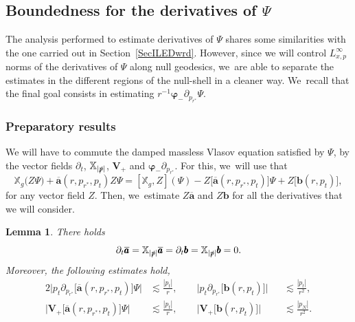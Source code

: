 \documentclass[10pt]{amsart}
\theoremstyle{plain}
\newtheorem{lemma}[proposition]{Lemma}
\theoremstyle{definition}
\newcommand\T{{\mathbb{X}}}
\begin{document}
\subsection{Boundedness for the derivatives of $\Psi$}

The analysis performed to estimate derivatives of $\Psi$ shares some similarities with the one carried out in Section~\ref{SecILEDwrd}. However, since we will control $L^\infty_{x,p}$ norms of the derivatives of $\Psi$ along null geodesics, we~are able to separate the estimates in the different regions of the null-shell in a cleaner way. We~recall that the final goal consists in estimating $r^{-1}\pmb{\varphi}_- \partial_{p_{r^*}} \Psi$.

\subsubsection{Preparatory results}
We will have to commute the damped massless Vlasov equation satisfied by $\Psi$, by the vector fields $\partial_t$, $\T_{|\slashed{p}|}$, $\pmb{V}_{\! +}$ and $ \pmb{ \varphi}_- \partial_{p_{r^*}}$. For this, we~will use that
\begin{equation}\label{eq:ComZ}
\T_g \bigl(Z \Psi \bigr)+ \overline{\pmb{a}}(r,p_{r^*},p_t) Z \Psi = [\T_g,Z] (\Psi)- Z \bigl[\overline{\pmb{a}}(r,p_{r^*},p_t) \bigr] \Psi+Z \bigl[\pmb{b} (r,p_t) \bigr],
\end{equation}
for any vector field $Z$. Then, we~estimate $Z\overline{\pmb{a}}$ and $Z\pmb{b}$ for all the derivatives that we will consider.

\begin{lemma}\label{Lemsourcetermesti}
There holds
\[
\partial_t \overline{\pmb{a}}=\T_{|\slashed{p}|} \overline{\pmb{a}}= \partial_t \pmb{b}=\T_{|\slashed{p}|} \pmb{b}=0.
\]
Moreover, the following estimates hold,
\begin{alignat*}{2}
\big| p_t \partial_{p_{r^*}} \bigl[ \overline{\pmb{a}} (r,p_{r^*},p_t) \bigr] \Psi \big| & \lesssim \frac{|p_t|}{r},\qquad \big| p_t \partial_{p_{r^*}} \bigl[ \pmb{b} (r,p_t) \bigr] \big| && \lesssim \frac{|p_t|}{r^2}, \\
\big| \pmb{V}_+ \bigl[ \overline{\pmb{a}} (r,p_{r^*},p_t) \bigr] \Psi \big| & \lesssim \frac{|p_t|}{r},\qquad \big| \pmb{V}_+ \bigl[ \pmb{b} (r,p_t) \bigr] \big| &&\lesssim \frac{|p_N|}{r^2}.
\end{alignat*}
\end{lemma}
\end{document}
